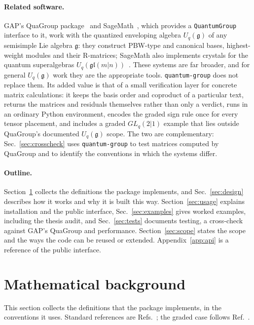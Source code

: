 \documentclass{SciPost}
\newcommand{\pkg}{\texttt{quantum-group}}
\newcommand{\code}[1]{\texttt{\begingroup\def\_{\textunderscore\allowbreak}#1\endgroup}}
\newcommand{\GL}{GL_q(2|1)}
\begin{document}
\paragraph{Related software.} GAP's QuaGroup package~\cite{gap,quagroup,degraaf2001} and SageMath~\cite{sagemath}, which provides a \code{QuantumGroup} interface to it, work with the quantized enveloping algebra $U_q(\mathfrak{g})$ of any semisimple Lie algebra $\mathfrak{g}$: they construct PBW-type and canonical bases, highest-weight modules and their R-matrices; SageMath also implements crystals for the quantum superalgebras $U_q(\mathfrak{gl}(m|n))$~\cite{bkk2000}. These systems are far broader, and for general $U_q(\mathfrak{g})$ work they are the appropriate tools. \pkg{} does not replace them. Its added value is that of a small verification layer for concrete matrix calculations: it keeps the basis order and coproduct of a particular text, returns the matrices and residuals themselves rather than only a verdict, runs in an ordinary Python environment, encodes the graded sign rule once for every tensor placement, and includes a graded $\GL$ example that lies outside QuaGroup's documented $U_q(\mathfrak{g})$ scope. The two are complementary: Sec.~\ref{sec:crosscheck} uses \pkg{} to test matrices computed by QuaGroup and to identify the conventions in which the systems differ.

\paragraph{Outline.} Section~\ref{sec:background} collects the definitions the package implements, and Sec.~\ref{sec:design} describes how it works and why it is built this way. Section~\ref{sec:usage} explains installation and the public interface, Sec.~\ref{sec:examples} gives worked examples, including the thesis audit, and Sec.~\ref{sec:tests} documents testing, a cross-check against GAP's QuaGroup and performance. Section~\ref{sec:scope} states the scope and the ways the code can be reused or extended. Appendix~\ref{app:api} is a reference of the public interface.


\section{Mathematical background}
\label{sec:background}

This section collects the definitions that the package implements, in the conventions it uses. Standard references are Refs.~\cite{drinfeld1987,jimbo1985,jimbo1986,kassel1995}; the graded case follows Ref.~\cite{celik2021}.
\end{document}

